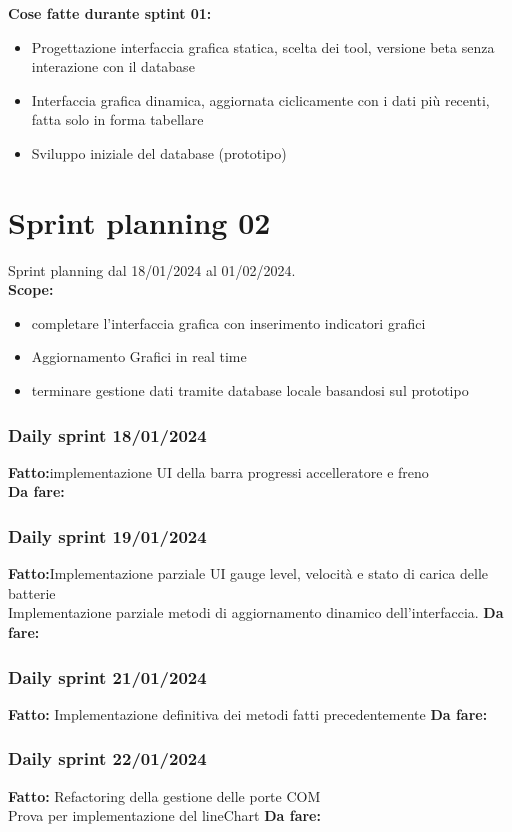 \documentclass{report}
\begin{document}
\textbf{Cose fatte durante sptint 01:}
\begin{itemize}
\item Progettazione interfaccia grafica statica, scelta dei tool, versione beta senza interazione con il database
\item Interfaccia grafica dinamica, aggiornata ciclicamente con i dati più recenti, fatta solo in forma tabellare
\item Sviluppo iniziale del database (prototipo)
\end{itemize}

\chapter{Sprint planning 02}
Sprint planning dal 18/01/2024 al 01/02/2024.\\

\textbf{Scope:}
\begin{itemize}
\item completare l'interfaccia grafica con inserimento indicatori grafici
\item Aggiornamento Grafici in real time 
\item terminare gestione dati tramite database locale basandosi sul prototipo
\end{itemize}

\subsection{Daily sprint 18/01/2024}
\textbf{Fatto:}implementazione UI della barra progressi accelleratore e freno\\
\textbf{Da fare:} 
\subsection{Daily sprint 19/01/2024}
\textbf{Fatto:}Implementazione parziale UI gauge level, velocità e stato di carica delle batterie\\
Implementazione parziale metodi di aggiornamento dinamico dell'interfaccia.
\textbf{Da fare:} 
\subsection{Daily sprint 21/01/2024}
\textbf{Fatto:} Implementazione definitiva dei metodi fatti precedentemente
\textbf{Da fare:} 
\subsection{Daily sprint 22/01/2024}
\textbf{Fatto:} Refactoring della gestione delle porte COM\\
Prova per implementazione del lineChart
\textbf{Da fare:} 
\end{document}
